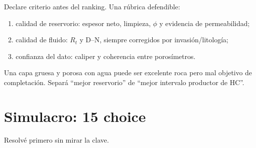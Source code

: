 \documentclass[10.5pt,a4paper]{article}
\begin{document}
Declare criterio antes del ranking. Una r\'ubrica defendible:
\begin{enumerate}
  \item calidad de reservorio: espesor neto, limpieza, $\phi$ y evidencia de permeabilidad;
  \item calidad de fluido: $R_t$ y D--N, siempre corregidos por invasi\'on/litolog\'ia;
  \item confianza del dato: caliper y coherencia entre poros\'imetros.
\end{enumerate}

Una capa gruesa y porosa con agua puede ser excelente roca pero mal objetivo de completaci\'on. Separ\'a ``mejor reservorio'' de ``mejor intervalo productor de HC''.

\section{Simulacro: 15 choice}

Resolv\'e primero sin mirar la clave.
\end{document}
